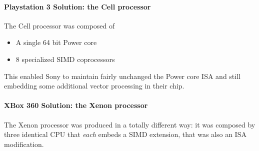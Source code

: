\documentclass[10pt,a4paper]{article}
\begin{document}
					\paragraph{Playstation 3 Solution: the Cell processor}
						The Cell processor was composed of
						\begin{itemize}
							\item A single 64 bit Power core
							\item 8 specialized SIMD coprocessors
						\end{itemize}
						This enabled Sony to maintain fairly unchanged the Power core ISA and still embedding some additional vector processing in their chip.
						
					\paragraph{XBox 360 Solution: the Xenon processor}
						The Xenon processor was produced in a totally different way: it was composed by three identical CPU that \emph{each} embeds a SIMD extension, that was also an ISA modification.
						
\end{document}
